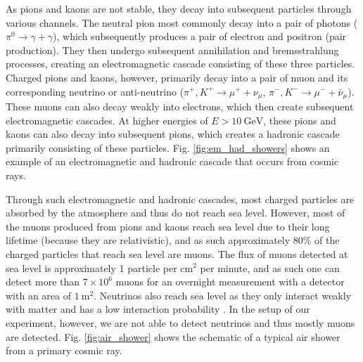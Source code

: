 \documentclass[a4paper]{report}
\numberwithin{equation}{section}
\begin{document}
As pions and kaons are not stable, they decay into subsequent particles through various channels.  
The neutral pion most commonly decay into a pair of photons ($\pi^0 \rightarrow \gamma + \gamma$), which subsequently produces a pair of electron and positron (pair production). They then undergo 
subsequent annihilation and bremsstrahlung processes, creating an electromagnetic cascade consisting of these three particles. Charged 
pions and kaons, however, primarily decay into a pair of muon and its corresponding neutrino or anti-neutrino ($\pi^+, K^+ \rightarrow \mu^+ + \nu_\mu$, $\pi^-, 
K^- \rightarrow \mu^- + \bar{\nu}_\mu$). These muons can also decay weakly into electrons, which then create subsequent electromagnetic cascades.
At higher energies of $E > \SI{10}{\giga\electronvolt}$, these pions and kaons can also decay into subsequent pions, which 
creates a hadronic cascade primarily consisting of these particles. Fig. \ref{fig:em_had_showers} shows an example of an electromagnetic and hadronic cascade that occurs from cosmic rays.


Through such electromagnetic and hadronic cascades, most charged particles are absorbed by the atmosphere and thus do not reach sea level. However, most of the muons 
produced from pions and kaons reach sea level due to their long lifetime (because they are relativistic), and as such approximately 80\% of the charged particles that reach sea level are muons.
The flux of muons detected at sea level is approximately 1 particle per cm$^2$ per minute, and as such one can detect more than $7 \times 10^{6}$ muons for an 
overnight measurement with a detector with an area of $\SI{1}{\meter\squared}$.  Neutrinos also reach sea level as they only interact weakly with matter and has a 
low interaction probability \cite{Grupen2005}. In the setup of our experiment, however, we are not able to detect neutrinos and thus mostly muons are detected. 
Fig. \ref{fig:air_shower} shows the schematic of a typical air shower from a primary cosmic ray. \par 
\end{document}
